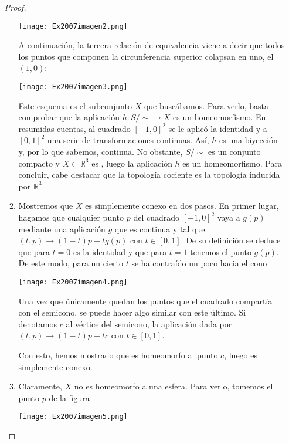 \begin{itemize}
\begin{proof}
\begin{enumerate}
		\begin{center}
			\texttt{[image: Ex2007imagen2.png]} 
		\end{center}
	
	A continuación, la tercera relación de equivalencia viene a decir que todos los puntos que componen la circunferencia superior colapsan en uno, el $(1,0)$:

		\begin{center}
			\texttt{[image: Ex2007imagen3.png]} 
		\end{center}
	
	Este esquema es el subconjunto $X$ que buscábamos. Para verlo, basta comprobar que la aplicación $h: S/\sim \to X$ es un homeomorfismo. En resumidas cuentas, al cuadrado $[-1,0]^2$ se le aplicó la identidad y a $[0,1]^2$ una serie de transformaciones continuas. Así, $h$ es una biyección y, por lo que sabemos, continua. No obstante, $S/\sim$ es un conjunto compacto y $X\subset \mathbb{R}^3$ es \hausdorff, luego la aplicación $h$ es un homeomorfismo. Para concluir, cabe destacar que la topología cociente es la topología inducida por $\mathbb{R}^3$.
	
	\item Mostremos que $X$ es simplemente conexo en dos pasos. En primer lugar, hagamos que cualquier punto $p$ del cuadrado $[-1,0]^2$ vaya a $g(p)$ mediante una aplicación $g$ que es continua y tal que $(t,p)\to (1-t)p+tg(p)$ con $t\in[0,1]$. De su definición se deduce que para $t=0$ es la identidad y que para $t=1$ tenemos el punto $g(p)$. De este modo, para un cierto $t$ se ha contraído un poco hacia el cono
	
		\begin{center}
			\texttt{[image: Ex2007imagen4.png]} 
		\end{center}
		
	Una vez que únicamente quedan los puntos que el cuadrado compartía con el semicono, se puede hacer algo similar con este último. Si denotamos $c$ al vértice del semicono, la aplicación dada por $(t,p)\to (1-t)p+tc$ con $t\in[0,1]$. 

	Con esto, hemos mostrado que es homeomorfo al punto $c$, luego es simplemente conexo. 
	
	\item Claramente, $X$ no es homeomorfo a una esfera. Para verlo, tomemos el punto $p$ de la figura
		
		\begin{center}
			\texttt{[image: Ex2007imagen5.png]} 
		\end{center}
		

\end{enumerate}
\end{proof}
\end{itemize}

